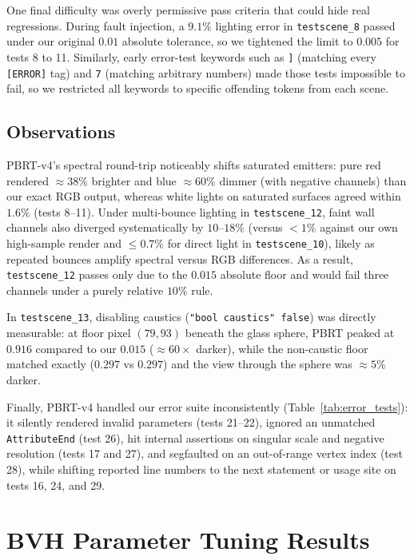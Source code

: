 \documentclass{article}
\begin{document}
One final difficulty was overly permissive pass criteria that could hide real regressions. During fault injection, a $9.1\%$ lighting error in \verb|testscene_8| passed under our original $0.01$ absolute tolerance, so we tightened the limit to $0.005$ for tests 8 to 11. Similarly, early error-test keywords such as \verb|]| (matching every \verb|[ERROR]| tag) and \verb|7| (matching arbitrary numbers) made those tests impossible to fail, so we restricted all keywords to specific offending tokens from each scene.

\subsection{Observations}

PBRT-v4's spectral round-trip noticeably shifts saturated emitters: pure red rendered $\approx 38\%$ brighter and blue $\approx 60\%$ dimmer (with negative channels) than our exact RGB output, whereas white lights on saturated surfaces agreed within $1.6\%$ (tests 8--11). Under multi-bounce lighting in \verb|testscene_12|, faint wall channels also diverged systematically by $10$--$18\%$ (versus $<1\%$ against our own high-sample render and $\le 0.7\%$ for direct light in \verb|testscene_10|), likely as repeated bounces amplify spectral versus RGB differences. As a result, \verb|testscene_12| passes only due to the $0.015$ absolute floor and would fail three channels under a purely relative $10\%$ rule.

In \verb|testscene_13|, disabling caustics (\verb|"bool caustics" false|) was directly measurable: at floor pixel $(79,93)$ beneath the glass sphere, PBRT peaked at $0.916$ compared to our $0.015$ ($\approx 60\times$ darker), while the non-caustic floor matched exactly ($0.297$ vs $0.297$) and the view through the sphere was $\approx 5\%$ darker.

Finally, PBRT-v4 handled our error suite inconsistently (Table~\ref{tab:error_tests}): it silently rendered invalid parameters (tests 21--22), ignored an unmatched \verb|AttributeEnd| (test 26), hit internal assertions on singular scale and negative resolution (tests 17 and 27), and segfaulted on an out-of-range vertex index (test 28), while shifting reported line numbers to the next statement or usage site on tests 16, 24, and 29.

\clearpage
\appendix

\section{BVH Parameter Tuning Results}
\end{document}
